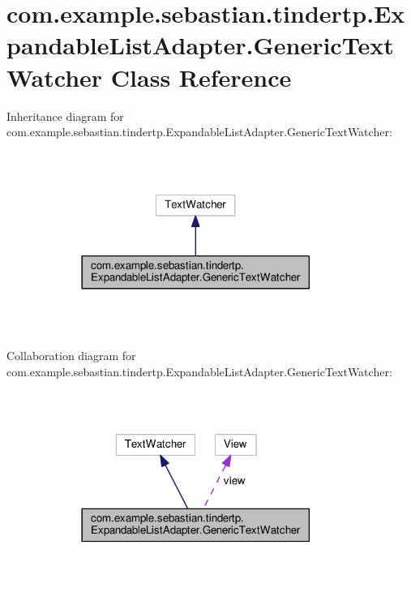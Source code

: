 \hypertarget{classcom_1_1example_1_1sebastian_1_1tindertp_1_1ExpandableListAdapter_1_1GenericTextWatcher}{}\section{com.\+example.\+sebastian.\+tindertp.\+Expandable\+List\+Adapter.\+Generic\+Text\+Watcher Class Reference}
\label{classcom_1_1example_1_1sebastian_1_1tindertp_1_1ExpandableListAdapter_1_1GenericTextWatcher}


Inheritance diagram for com.\+example.\+sebastian.\+tindertp.\+Expandable\+List\+Adapter.\+Generic\+Text\+Watcher\+:\nopagebreak
\begin{figure}[H]
\begin{center}
\leavevmode
\includegraphics[width=290pt]{classcom_1_1example_1_1sebastian_1_1tindertp_1_1ExpandableListAdapter_1_1GenericTextWatcher__inherit__graph}
\end{center}
\end{figure}


Collaboration diagram for com.\+example.\+sebastian.\+tindertp.\+Expandable\+List\+Adapter.\+Generic\+Text\+Watcher\+:\nopagebreak
\begin{figure}[H]
\begin{center}
\leavevmode
\includegraphics[width=290pt]{classcom_1_1example_1_1sebastian_1_1tindertp_1_1ExpandableListAdapter_1_1GenericTextWatcher__coll__graph}
\end{center}
\end{figure}

